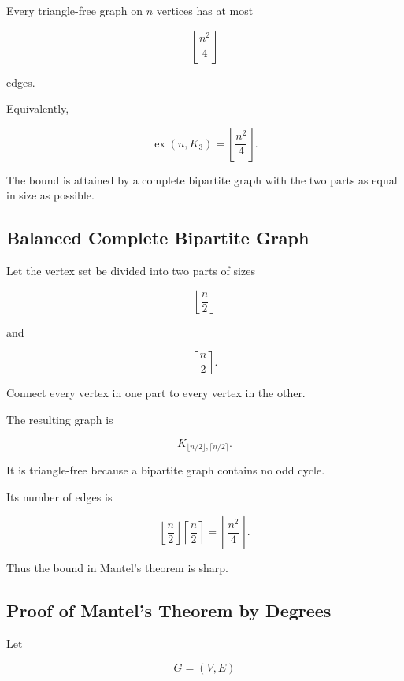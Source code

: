 \begin{theorem}
Every triangle-free graph on \(n\) vertices has at most

\[
\boxed{
\left\lfloor\frac{n^2}{4}\right\rfloor
}
\]

edges.

Equivalently,

\[
\boxed{
\operatorname{ex}(n,K_3)
=
\left\lfloor\frac{n^2}{4}\right\rfloor.
}
\]
\end{theorem}

The bound is attained by a complete bipartite graph with the two parts
as equal in size as possible.

\subsection{Balanced Complete Bipartite Graph}
\label{subsec:balanced-complete-bipartite}

Let the vertex set be divided into two parts of sizes

\[
\left\lfloor\frac n2\right\rfloor
\]

and

\[
\left\lceil\frac n2\right\rceil.
\]

Connect every vertex in one part to every vertex in the other.

The resulting graph is

\[
\boxed{
K_{\lfloor n/2\rfloor,\lceil n/2\rceil}.
}
\]

It is triangle-free because a bipartite graph contains no odd cycle.

Its number of edges is

\[
\left\lfloor\frac n2\right\rfloor
\left\lceil\frac n2\right\rceil
=
\boxed{
\left\lfloor\frac{n^2}{4}\right\rfloor.
}
\]

Thus the bound in Mantel's theorem is sharp.

\subsection{Proof of Mantel's Theorem by Degrees}
\label{subsec:mantel-proof-degrees}

Let

\[
G=(V,E)
\]

